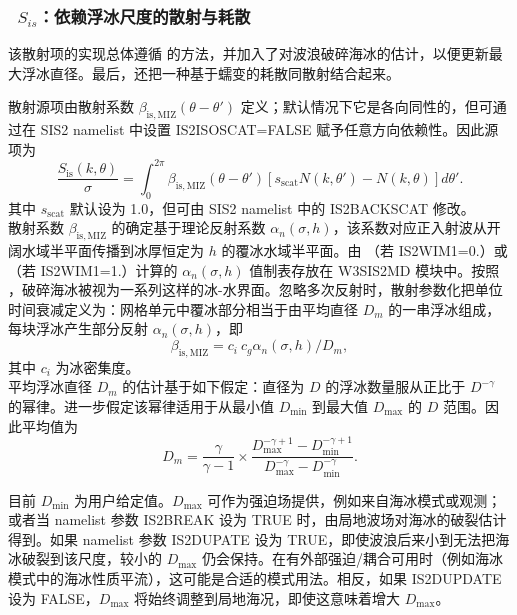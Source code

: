 \vsssub
\subsubsection{~$S_{is}$：依赖浮冰尺度的散射与耗散} \label{sec:IS2}
\vsssub



该散射项的实现总体遵循 \cite{art:MM06} 的方法，并加入了对波浪破碎海冰的估计，以便更新最大浮冰直径。最后，还把一种基于蠕变的耗散同散射结合起来。


散射源项由散射系数 $\beta_{\mathrm{is},\mathrm{MIZ}}(\theta-\theta')$ 定义；默认情况下它是各向同性的，但可通过在 {\F SIS2} namelist 中设置 {\code IS2ISOSCAT=FALSE} 赋予任意方向依赖性。因此源项为
\begin{equation}
 \frac{S_{\mathrm{is}}(k,\theta)}{\sigma} =  \int_0^{2\pi}\beta_{\mathrm{is},\mathrm{MIZ}}(\theta-\theta') [s_\mathrm{scat}  N(k,\theta')-N(k,\theta)] d\theta'  .
 \end{equation}
其中 $s_\mathrm{scat}$ 默认设为 1.0，但可由 {\F SIS2} namelist 中的 {\code IS2BACKSCAT} 修改。\\


散射系数 $\beta_{\mathrm{is},\mathrm{MIZ}}$ 的确定基于理论反射系数 $\alpha_n(\sigma,h)$，该系数对应正入射波从开阔水域半平面传播到冰厚恒定为 $h$ 的覆冰水域半平面。由 \cite{art:KM08}（若 {\code IS2WIM1=0.}）或 \cite{art:Ben12}（若 {\code IS2WIM1=1.}）计算的 $\alpha_n(\sigma,h)$ 值制表存放在 {\code W3SIS2MD} 模块中。按照 \cite{art:Dea11}，破碎海冰被视为一系列这样的冰-水界面。忽略多次反射时，散射参数化把单位时间衰减定义为：网格单元中覆冰部分相当于由平均直径 $D_{m}$ 的一串浮冰组成，每块浮冰产生部分反射 $\alpha_n(\sigma,h)$，即
\begin{equation}
\beta_{\mathrm{is},\mathrm{MIZ}}=c_i~c_g \alpha_n(\sigma,h) / D_{m},
 \end{equation}
其中 $c_i$ 为冰密集度。\\
 

平均浮冰直径 $D_m$ 的估计基于如下假定：直径为 $D$ 的浮冰数量服从正比于 $D^{-\gamma}$ 的幂律。进一步假定该幂律适用于从最小值 $D_{\min}$ 到最大值 $D_{\max}$ 的 $D$ 范围。因此平均值为
\begin{equation}
D_m=\frac{\gamma}{\gamma -1}\times\frac{D_{\max}^{-\gamma +1}-D_{\min}^{-\gamma +1}}{D_{\max}^{-\gamma}-D_{\min}^{-\gamma}}.
\label{analytic_Dbar}
\end{equation}

\noindent
目前 $D_{\min}$ 为用户给定值。$D_{\max}$ 可作为强迫场提供，例如来自海冰模式或观测；或者当 namelist 参数 {\code IS2BREAK} 设为 {\code TRUE} 时，由局地波场对海冰的破裂估计得到。如果 namelist 参数 {\code IS2DUPATE} 设为 {\code TRUE}，即使波浪后来小到无法把海冰破裂到该尺度，较小的 $D_{\max}$ 仍会保持。在有外部强迫/耦合可用时（例如海冰模式中的海冰性质平流），这可能是合适的模式用法。相反，如果 {\code IS2DUPDATE} 设为 {\code FALSE}，$D_{\max}$ 将始终调整到局地海况，即使这意味着增大 $D_{\max}$。\\


